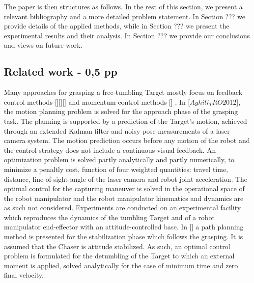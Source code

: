 The paper is then structures as follows. In the rest of this section, we present a relevant bibliography and a more detailed problem statement. In Section ??? we provide details of the applied methods, while in Section ??? we present the experimental results and their analysis. In Section ??? we provide our conclusions and views on future work.
%
\subsection{Related work - 0,5 pp}
%
Many approaches for grasping a free-tumbling Target mostly focus on feedback control methods [][][]%
and momentum control methods []%
. In [$Aghili_TRO2012$], the motion planning problem is solved for the approach phase of the grasping task. The planning is supported by a prediction of the Target's motion, achieved through an extended Kalman filter and noisy pose measurements of a laser camera system. The motion prediction occurs before any motion of the robot and the control strategy does not include a continuous visual feedback. An optimization problem is solved partly analytically and partly numerically, to minimize a penaltly cost, function of four weighted quantities: travel time, distance, line-of-sight angle of the laser camera and robot joint acceleration. The optimal control for the capturing maneuver is solved in the operational space of the robot manipulator and the robot manipulator kinematics and dynamics are as such not considered. Experiments are conducted on an experimental facility which reproduces the dynamics of the tumbling Target and of a robot manipulator end-effector with an attitude-controlled base. In []%
a path planning method is presented for the stabilization phase which follows the grasping. It is assumed that the Chaser is attitude stabilized. As such, an optimal control problem is formulated for the detumbling of the Target to which an external moment is applied, solved analytically for the case of minimum time and zero final velocity.

